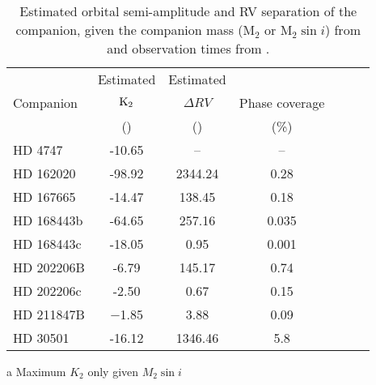 \begin{table*}
        \small
        \centering
       \begin{threeparttable}[b]
        \caption{Estimated orbital semi-amplitude and {RV} separation of the companion, given the companion mass (\(\textrm{M}_{2}\) or \(\textrm{M}_{2} \sin{i}\)) from  and observation times from .} 
       \begin{tabular}{l c c c c c c}%
           \toprule
           & Estimated & Estimated & & \\  %
           Companion & \(\rm K_2\) & \(\Delta {RV}\) & Phase coverage\\
           & (\kmps{}) & (\mps{}) & (\%)\\
           \midrule
           {HD 4747} & -10.65 & -- & --\\  %
           {HD 162020} & -98.92\tnote{a} & 2344.24 & 0.28\\  %
           {HD 167665} & -14.47\tnote{a} & 138.45 & 0.18\\  %
           {HD 168443b} & -64.65\tnote{a}& 257.16 & 0.035\\ 
           {HD 168443c} & -18.05\tnote{a} & 0.95 & 0.001\\  %
           {HD 202206}B & -6.79 & 145.17 & 0.74\\  %
           {HD 202206}c & -2.50 & 0.67 & 0.15\\  %
           {HD 211847}B & $-$1.85 & 3.88 & 0.09\\  %
           {HD 30501} & -16.12 & 1346.46 & 5.8\\
           \bottomrule   
           \end{tabular}
            \label{tab:estimated_rv}
    \begin{tablenotes}
        \item[a] {Maximum \(K_2\) only given \(M_2 \sin{i}\)}
      \end{tablenotes}
  \end{threeparttable}

\end{table*}